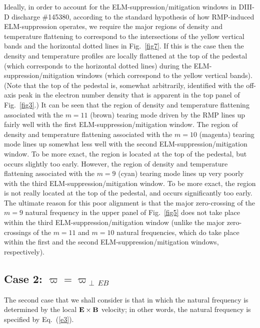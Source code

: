 \documentclass[12pt,prb,aps]{revtex4-1}
\begin{document}
 Ideally, in order to account for the
ELM-suppression/mitigation windows in DIII-D discharge \#145380, according to the standard
hypothesis of how RMP-induced ELM-suppression operates, we require the major regions of density and temperature
flattening to correspond to the intersections of the yellow vertical bands and the horizontal dotted lines in Fig.~\ref{fig7}. If this is the case then
the density and temperature profiles are locally flattened at the top of the pedestal (which corresponds to
the horizontal dotted lines) during the ELM-suppression/mitigation windows (which correspond to the yellow vertical bands). (Note that the top of the pedestal
is, somewhat arbitrarily, identified with the off-axis peak in the electron number density that is apparent in the top panel of Fig.~\ref{fig3}.) It can be seen
that the region of density and temperature flattening associated with the $m=11$ (brown) tearing mode driven by the RMP lines up fairly well with the
first ELM-suppression/mitigation window. The region of density and temperature flattening associated with the $m=10$ (magenta) tearing mode 
lines up somewhat less well with the second ELM-suppression/mitigation window. To be more exact, the region is located at the top of the pedestal,
but occurs slightly too early. However, the 
region of density and temperature flattening associated with the $m=9$ (cyan) tearing mode 
lines up very poorly with the third ELM-suppression/mitigation window. To be more exact, the region is not really located at the top of the pedestal, and occurs
significantly too early. The ultimate reason for this poor alignment is that the major zero-crossing of the $m=9$ natural
frequency in the upper panel of Fig.~\ref{fig5} does not take place within the third ELM-suppression/mitigation window (unlike the
major zero-crossings of the $m=11$ and $m=10$ natural frequencies, which do take place within the first and the second
ELM-suppression/mitigation windows, respectively). 

\subsection{Case 2: $\varpi=\varpi_{\perp\,EB}$}
The second case that we shall consider is that in which the natural frequency is determined by the local ${\bf E}\times {\bf B}$ velocity; 
in other words, the natural frequency is specified by Eq.~(\ref{e3}). 
\end{document}
